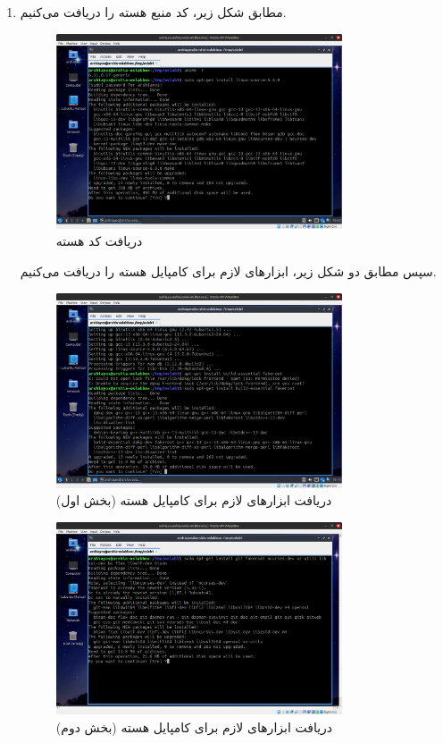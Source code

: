 \documentclass[12pt]{article}
\begin{document}
        \begin{enumerate}
        \item مطابق شکل زیر، کد منبع هسته را دریافت می‌کنیم.
        
        \begin{figure}[H]
		\centering
		\includegraphics[width=0.8\textwidth]{report1-resources/29.png}
		\caption{دریافت کد هسته}
	\end{figure}

        سپس  مطابق دو شکل زیر، ابزارهای لازم برای کامپایل هسته را دریافت می‌کنیم.

        \begin{figure}[H]
		\centering
		\includegraphics[width=0.8\textwidth]{report1-resources/33.png}
		\caption{دریافت ابزارهای لازم برای کامپایل هسته (بخش اول)}
	\end{figure}

        \begin{figure}[H]
		\centering
		\includegraphics[width=0.8\textwidth]{report1-resources/34.png}
		\caption{دریافت ابزارهای لازم برای کامپایل هسته (بخش دوم)}
	\end{figure}


\end{enumerate}
\end{document}
